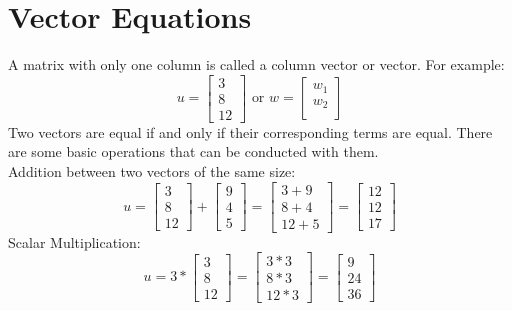 \documentclass[nobib]{tufte-handout}
\begin{document}
\section{Vector Equations}
A matrix with only one column is called a column vector or vector. For example:
\begin{equation*}
    u =
    \begin{bmatrix}
        3 \\
        8 \\
        12
    \end{bmatrix}
    \text{ or } w =
    \begin{bmatrix}
        w_1 \\
        w_2 \\
    \end{bmatrix}
\end{equation*}
Two vectors are equal if and only if their corresponding terms are equal.
There are some basic operations that can be conducted with them.\\
Addition between two vectors of the same size:
\begin{equation*}
    u =
    \begin{bmatrix}
        3 \\
        8 \\
        12
    \end{bmatrix}
    +
    \begin{bmatrix}
        9 \\
        4 \\
        5
    \end{bmatrix}
    =
    \begin{bmatrix}
        3+9 \\
        8+4 \\
        12+5
    \end{bmatrix} =
    \begin{bmatrix}
        12 \\
        12 \\
        17
    \end{bmatrix}
\end{equation*}
Scalar Multiplication:
\begin{equation*}
    u = 3*
    \begin{bmatrix}
        3 \\
        8 \\
        12
    \end{bmatrix}
    =
    \begin{bmatrix}
        3*3 \\
        8*3 \\
        12*3
    \end{bmatrix} =
    \begin{bmatrix}
        9  \\
        24 \\
        36
    \end{bmatrix}
\end{equation*}
\end{document}
